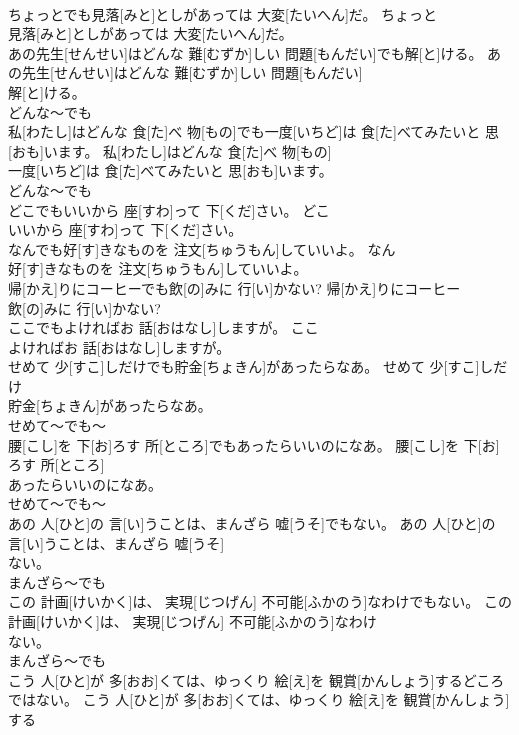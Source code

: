 \documentclass[8pt]{extreport}
\begin{document}
\begin{CJK}{UTF8}{min}
\\	ちょっとでも見落[みと]としがあっては 大変[たいへん]だ。	ちょっと
\\	見落[みと]としがあっては 大変[たいへん]だ。	
\\	あの先生[せんせい]はどんな 難[むずか]しい 問題[もんだい]でも解[と]ける。	あの先生[せんせい]はどんな 難[むずか]しい 問題[もんだい]
\\	解[と]ける。	
\\	どんな～でも
\\	私[わたし]はどんな 食[た]べ 物[もの]でも一度[いちど]は 食[た]べてみたいと 思[おも]います。	私[わたし]はどんな 食[た]べ 物[もの]
\\	一度[いちど]は 食[た]べてみたいと 思[おも]います。	
\\	どんな～でも
\\	どこでもいいから 座[すわ]って 下[くだ]さい。	どこ
\\	いいから 座[すわ]って 下[くだ]さい。	
\\	なんでも好[す]きなものを 注文[ちゅうもん]していいよ。	なん
\\	好[す]きなものを 注文[ちゅうもん]していいよ。	
\\	帰[かえ]りにコーヒーでも飲[の]みに 行[い]かない?	帰[かえ]りにコーヒー
\\	飲[の]みに 行[い]かない?	
\\	ここでもよければお 話[おはなし]しますが。	ここ
\\	よければお 話[おはなし]しますが。	
\\	せめて 少[すこ]しだけでも貯金[ちょきん]があったらなあ。	せめて 少[すこ]しだけ
\\	貯金[ちょきん]があったらなあ。	
\\	せめて～でも～ 
\\	腰[こし]を 下[お]ろす 所[ところ]でもあったらいいのになあ。	腰[こし]を 下[お]ろす 所[ところ]
\\	あったらいいのになあ。	
\\	せめて～でも～ 
\\	あの 人[ひと]の 言[い]うことは、まんざら 嘘[うそ]でもない。	あの 人[ひと]の 言[い]うことは、まんざら 嘘[うそ]
\\	ない。	
\\	まんざら～でも 
\\	この 計画[けいかく]は、 実現[じつげん] 不可能[ふかのう]なわけでもない。	この 計画[けいかく]は、 実現[じつげん] 不可能[ふかのう]なわけ
\\	ない。	
\\	まんざら～でも 
\\	こう 人[ひと]が 多[おお]くては、ゆっくり 絵[え]を 観賞[かんしょう]するどころではない。	こう 人[ひと]が 多[おお]くては、ゆっくり 絵[え]を 観賞[かんしょう]する

\end{CJK}
\end{document}

